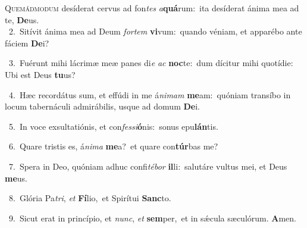 \lettrine{\initial\textcolor{\initialcolor}{Q}}{uemádmodum} desíderat cervus ad fon\textit{tes} \textit{a}\-\textbf{quá}rum:~\star ita desíderat ánima mea ad te, \textbf{De}\-us.\\
{\numbfont\textcolor{\numbcolor}{~2.}}~Sitívit ánima mea ad Deum \textit{for}\-\textit{tem} \textbf{vi}\-vum:~\star quando véniam, et apparébo ante fáciem \textbf{De}\-i?\par
{\numbfont\textcolor{\numbcolor}{~3.}}~Fuérunt mihi lácrimæ meæ panes di\textit{e} \textit{ac} \textbf{noc}\-te:~\star dum dícitur mihi quotídie: Ubi est Deus \textbf{tu}\-us?\par
{\numbfont\textcolor{\numbcolor}{~4.}}~Hæc recordátus sum, et effúdi in me á\-\textit{ni}\-\textit{mam} \textbf{me}\-am:~\star quóniam transíbo in locum tabernáculi admirábilis, usque ad domum \textbf{De}\-i.\par
{\numbfont\textcolor{\numbcolor}{~5.}}~In voce exsultatiónis, et con\-\textit{fes}\-\textit{si}\textbf{ó}nis:~\star sonus epu\-\textbf{lán}\-tis.\par
{\numbfont\textcolor{\numbcolor}{~6.}}~Quare tristis es, á\-\textit{ni}\-\textit{ma} \textbf{me}\-a?~\star et quare con\-\textbf{túr}\-bas me?\par
{\numbfont\textcolor{\numbcolor}{~7.}}~Spera in Deo, quóniam adhuc confi\-\textit{té}\-\textit{bor} \textbf{il}\-li:~\star salutáre vultus mei, et Deus \textbf{me}\-us.\par
{\numbfont\textcolor{\numbcolor}{~8.}}~Glória Pa\-\textit{tri}\-, \textit{et} \textbf{Fí}\-lio,~\star et Spirítui \textbf{Sanc}\-to.\par
{\numbfont\textcolor{\numbcolor}{~9.}}~Sicut erat in princípio, et \textit{nunc}\-, \textit{et} \textbf{sem}\-per,~\star et in sǽcula sæculórum. \textbf{A}\-men.\par

